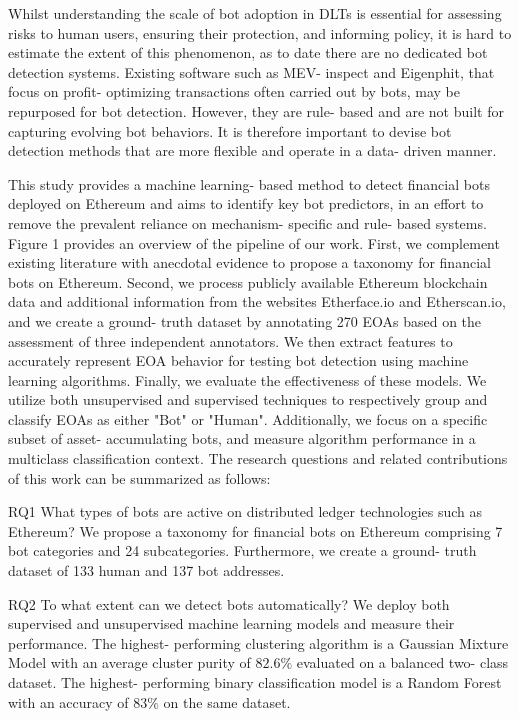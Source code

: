 Whilst understanding the scale of bot adoption in DLTs is essential for assessing risks to human users, ensuring their protection, and informing policy, it is hard to estimate the extent of this phenomenon, as to date there are no dedicated bot detection systems. Existing software such as MEV- inspect and Eigenphit, that focus on profit- optimizing transactions often carried out by bots, may be repurposed for bot detection. However, they are rule- based and are not built for capturing evolving bot behaviors. It is therefore important to devise bot detection methods that are more flexible and operate in a data- driven manner.

This study provides a machine learning- based method to detect financial bots deployed on Ethereum and aims to identify key bot predictors, in an effort to remove the prevalent reliance on mechanism- specific and rule- based systems. Figure 1 provides an overview of the pipeline of our work. First, we complement existing literature with anecdotal evidence to propose a taxonomy for financial bots on Ethereum. Second, we process publicly available Ethereum blockchain data and additional information from the websites Etherface.io and Etherscan.io, and we create a ground- truth dataset by annotating 270 EOAs based on the assessment of three independent annotators. We then extract features to accurately represent EOA behavior for testing bot detection using machine learning algorithms. Finally, we evaluate the effectiveness of these models. We utilize both unsupervised and supervised techniques to respectively group and classify EOAs as either "Bot" or "Human". Additionally, we focus on a specific subset of asset- accumulating bots, and measure algorithm performance in a multiclass classification context. The research questions and related contributions of this work can be summarized as follows:

RQ1 What types of bots are active on distributed ledger technologies such as Ethereum? We propose a taxonomy for financial bots on Ethereum comprising 7 bot categories and 24 subcategories. Furthermore, we create a ground- truth dataset of 133 human and 137 bot addresses.

RQ2 To what extent can we detect bots automatically? We deploy both supervised and unsupervised machine learning models and measure their performance. The highest- performing clustering algorithm is a Gaussian Mixture Model with an average cluster purity of \(82.6\%\) evaluated on a balanced two- class dataset. The highest- performing binary classification model is a Random Forest with an accuracy of \(83\%\) on the same dataset.

